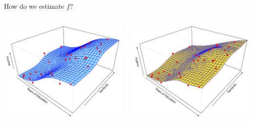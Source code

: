 \documentclass[14pt]{beamer}
\begin{document}
\begin{frame}{How do we estimate $f$?}
\vspace{.5cm}

  \begin{columns}
    \begin{column}{0.5\textwidth}
      \centering
      \includegraphics[width = \textwidth]{2-3.pdf}
    \end{column}
    \begin{column}{0.5\textwidth}
      \centering
      \includegraphics[width = \textwidth]{2-5.pdf}
    \end{column}
  \end{columns}
\end{frame}
\end{document}
